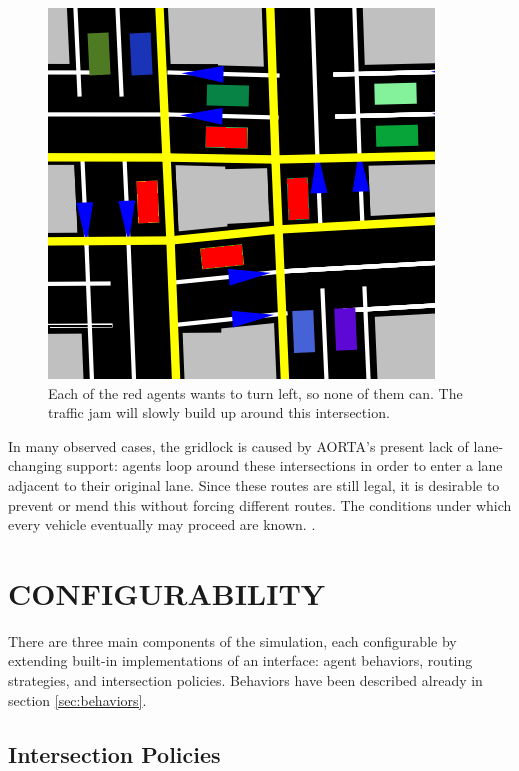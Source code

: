 \documentclass[letterpaper, 10 pt, conference]{ieeeconf}  %
\begin{document}
\begin{figure}[h]
  \centering \includegraphics[scale=0.25]{gridlock.png}
  \caption{Each of the red agents wants to turn left, so none of them
           can. The traffic jam will slowly build up around this intersection.}
  \label{fig:gridlock}
  \vspace{-10pt}
\end{figure}

In many observed cases, the gridlock is caused by AORTA's present lack of
lane-changing support: agents loop around these intersections in order to enter
a lane adjacent to their original lane. Since these routes are still legal, it
is desirable to prevent or mend this without forcing different routes. The
conditions under which every vehicle eventually may proceed are known.
\cite{AAAI11-au}.


\section{CONFIGURABILITY}
\label{sec:config}

There are three main components of the simulation, each configurable by
extending built-in implementations of an interface: agent behaviors, routing
strategies, and intersection policies. Behaviors have been described already in
section \ref{sec:behaviors}.

\subsection{Intersection Policies}
\end{document}

